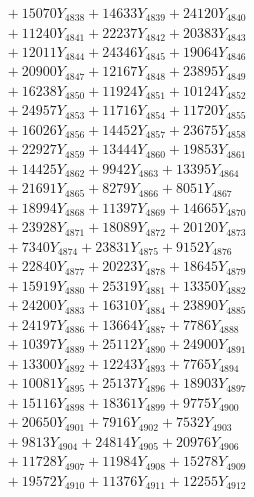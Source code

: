 \documentclass[a4paper,10pt]{article}
\begin{document}
{\begin{align}
&\;  + 15070 Y_{4838} + 14633 Y_{4839} + 24120 Y_{4840} \\[0.3ex]
&\;  + 11240 Y_{4841} + 22237 Y_{4842} + 20383 Y_{4843} \\[0.3ex]
&\;  + 12011 Y_{4844} + 24346 Y_{4845} + 19064 Y_{4846} \\[0.3ex]
&\;  + 20900 Y_{4847} + 12167 Y_{4848} + 23895 Y_{4849} \\[0.3ex]
&\;  + 16238 Y_{4850} + 11924 Y_{4851} + 10124 Y_{4852} \\[0.3ex]
&\;  + 24957 Y_{4853} + 11716 Y_{4854} + 11720 Y_{4855} \\[0.3ex]
&\;  + 16026 Y_{4856} + 14452 Y_{4857} + 23675 Y_{4858} \\[0.5ex]\allowbreak
&\;  + 22927 Y_{4859} + 13444 Y_{4860} + 19853 Y_{4861} \\[0.3ex]
&\;  + 14425 Y_{4862} + 9942 Y_{4863} + 13395 Y_{4864} \\[0.3ex]
&\;  + 21691 Y_{4865} + 8279 Y_{4866} + 8051 Y_{4867} \\[0.3ex]
&\;  + 18994 Y_{4868} + 11397 Y_{4869} + 14665 Y_{4870} \\[0.3ex]
&\;  + 23928 Y_{4871} + 18089 Y_{4872} + 20120 Y_{4873} \\[0.3ex]
&\;  + 7340 Y_{4874} + 23831 Y_{4875} + 9152 Y_{4876} \\[0.3ex]
&\;  + 22840 Y_{4877} + 20223 Y_{4878} + 18645 Y_{4879} \\[0.3ex]
&\;  + 15919 Y_{4880} + 25319 Y_{4881} + 13350 Y_{4882} \\[0.3ex]
&\;  + 24200 Y_{4883} + 16310 Y_{4884} + 23890 Y_{4885} \\[0.3ex]
&\;  + 24197 Y_{4886} + 13664 Y_{4887} + 7786 Y_{4888} \\[0.5ex]\allowbreak
&\;  + 10397 Y_{4889} + 25112 Y_{4890} + 24900 Y_{4891} \\[0.3ex]
&\;  + 13300 Y_{4892} + 12243 Y_{4893} + 7765 Y_{4894} \\[0.3ex]
&\;  + 10081 Y_{4895} + 25137 Y_{4896} + 18903 Y_{4897} \\[0.3ex]
&\;  + 15116 Y_{4898} + 18361 Y_{4899} + 9775 Y_{4900} \\[0.3ex]
&\;  + 20650 Y_{4901} + 7916 Y_{4902} + 7532 Y_{4903} \\[0.3ex]
&\;  + 9813 Y_{4904} + 24814 Y_{4905} + 20976 Y_{4906} \\[0.3ex]
&\;  + 11728 Y_{4907} + 11984 Y_{4908} + 15278 Y_{4909} \\[0.3ex]
&\;  + 19572 Y_{4910} + 11376 Y_{4911} + 12255 Y_{4912} \\[0.3ex]

\end{align}}
\end{document}
